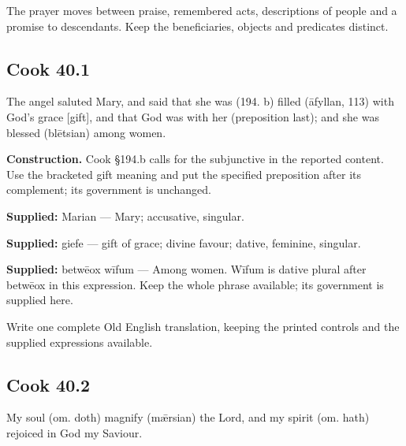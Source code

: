 The prayer moves between praise, remembered acts, descriptions of people and a promise to descendants. Keep the beneficiaries, objects and predicates distinct.

\par\begin{minipage}{\linewidth}\raggedright
\subsection*{Cook 40.1}

The angel saluted Mary, and said that she was (194. b) filled (āfyllan, 113) with God’s grace [gift], and that God was with her (preposition last); and she was blessed (blētsian) among women.

\textbf{Construction.} Cook §194.b calls for the subjunctive in the reported content. Use the bracketed gift meaning and put the specified preposition after its complement; its government is unchanged.

\end{minipage}\par\addvspace{4pt}

\textbf{Supplied:} Marian — Mary; accusative, singular.

\textbf{Supplied:} giefe — gift of grace; divine favour; dative, feminine, singular.

\textbf{Supplied:} betwēox wīfum — Among women. Wīfum is dative plural after betwēox in this expression. Keep the whole phrase available; its government is supplied here.

Write one complete Old English translation, keeping the printed controls and the supplied expressions available.

\par\begin{minipage}{\linewidth}\raggedright
\subsection*{Cook 40.2}

My soul (om. doth) magnify (mǣrsian) the Lord, and my spirit (om. hath) rejoiced in God my Saviour.

\end{minipage}\par\addvspace{4pt}

